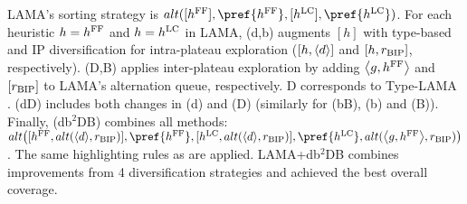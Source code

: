 \begin{table*}[htb]
{ %
LAMA's sorting strategy is $alt([\ff],\pref{\ff},[\lc],\pref{\lc})$.
For each heuristic $h=\text{$h^\text{FF}$}$ and $h=\text{$h^\text{LC}$}$ in LAMA,
(d,b) augments $[h]$ with type-based and IP diversification for intra-plateau exploration ($[h,{\left<d\right>}]$ and $[h,r_\text{BIP}]$, respectively).
(D,B) applies inter-plateau exploration by adding ${\left<g,\text{$h^\text{FF}$}\right>}$ and $[r_\text{BIP}]$ to LAMA's alternation queue, respectively. D corresponds to Type-LAMA \cite{xie14type}.
(dD) includes both changes in (d) and (D) (similarly for (bB), (b) and (B)).
Finally, (db$^2$DB) combines all methods:
{\small $alt\big([\ff,alt(\depth,\bip)], \pref{\ff}, [\lc,alt(\depth,\bip)], \pref{\lc}, alt(\brackets{g,\ff},\bip)\big)$.}
The same highlighting rules as  are applied.
LAMA+db$^2$DB combines improvements from 4 diversification strategies and achieved the best overall coverage.
}
\label{tbl:lama}
\end{table*}

